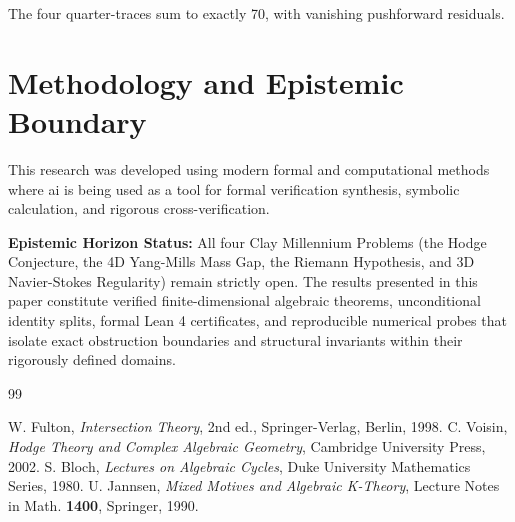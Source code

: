 \documentclass[11pt,a4paper]{article}
\theoremstyle{definition}
\begin{document}
\noindent The four quarter-traces sum to exactly 70, with vanishing pushforward residuals.


\section{Methodology and Epistemic Boundary}
\noindent This research was developed using modern formal and computational methods where ai is being used as a tool for formal verification synthesis, symbolic calculation, and rigorous cross-verification.

\vspace{0.5em}
\noindent\textbf{Epistemic Horizon Status:} All four Clay Millennium Problems (the Hodge Conjecture, the 4D Yang-Mills Mass Gap, the Riemann Hypothesis, and 3D Navier-Stokes Regularity) remain strictly open. The results presented in this paper constitute verified finite-dimensional algebraic theorems, unconditional identity splits, formal Lean 4 certificates, and reproducible numerical probes that isolate exact obstruction boundaries and structural invariants within their rigorously defined domains.

\begin{thebibliography}{99}

 W. Fulton, \emph{Intersection Theory}, 2nd ed., Springer-Verlag, Berlin, 1998.
 C. Voisin, \emph{Hodge Theory and Complex Algebraic Geometry}, Cambridge University Press, 2002.
 S. Bloch, \emph{Lectures on Algebraic Cycles}, Duke University Mathematics Series, 1980.
 U. Jannsen, \emph{Mixed Motives and Algebraic K-Theory}, Lecture Notes in Math. \textbf{1400}, Springer, 1990.

\end{thebibliography}
\end{document}
